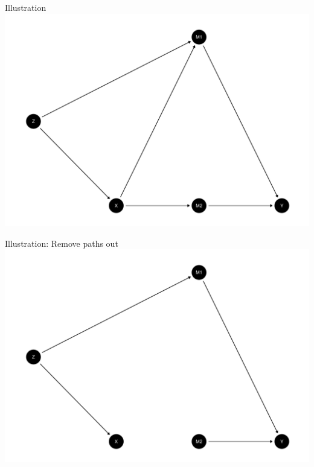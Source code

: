 \documentclass[
  11pt,
  ignorenonframetext,
]{beamer}
\begin{document}
\begin{frame}{Illustration}
\protect\hypertarget{illustration}{}
\includegraphics{2.2_estimands_files/figure-beamer/unnamed-chunk-2-1.pdf}
\end{frame}

\begin{frame}{Illustration: Remove paths out}
\protect\hypertarget{illustration-remove-paths-out}{}
\includegraphics{2.2_estimands_files/figure-beamer/unnamed-chunk-3-1.pdf}
\end{frame}
\end{document}
